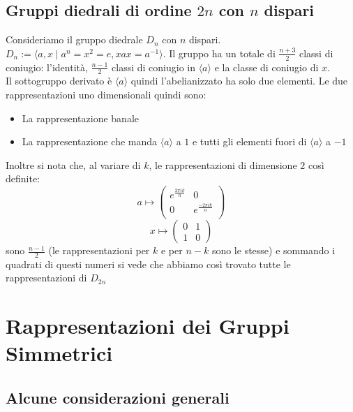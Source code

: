 \documentclass[a4paper,NoNotes,GeneralMath]{stdmdoc}
\newcommand{\gen}[1]{\langle #1 \rangle}
\begin{document}
	\subsection{Gruppi diedrali di ordine $2n$ con $n$ dispari}
	Consideriamo il gruppo diedrale $D_{n}$ con $n$ dispari. $D_{n} := \langle a, x \mid a^n = x^2 = e, xax = a^{-1} \rangle$. Il gruppo ha un totale di $\frac{n+3}{2}$ classi di coniugio: l'identità, $\frac{n-1}{2}$ classi di coniugio in $\gen{a}$ e la classe di coniugio di $x$. \\
	Il sottogruppo derivato è $\gen{a}$ quindi l'abelianizzato ha solo due elementi. Le due rappresentazioni uno dimensionali quindi sono:
	\begin{itemize}
		\item La rappresentazione banale
		\item La rappresentazione che manda $\gen{a}$ a $1$ e tutti gli elementi fuori di $\gen{a}$ a $-1$
	\end{itemize}
	Inoltre si nota che, al variare di $k$, le rappresentazioni di dimensione $2$ così definite: $$a \mapsto \left( \begin{array}{cc} e^{ \frac{2\pi ik}{n} } & 0 \\ 0 & e^{ \frac{-2\pi ik}{n} } \\ \end{array} \right) $$ $$x \mapsto \left( \begin{array}{cc} 0 & 1 \\ 1 & 0 \end{array} \right)$$ sono $\frac{n-1}{2}$ (le rappresentazioni per $k$ e per $n-k$ sono le stesse) e sommando i quadrati di questi numeri si vede che abbiamo così trovato tutte le rappresentazioni di $D_{2n}$

	\section{Rappresentazioni dei Gruppi Simmetrici}
	\subsection{Alcune considerazioni generali}
	
	
\end{document}
